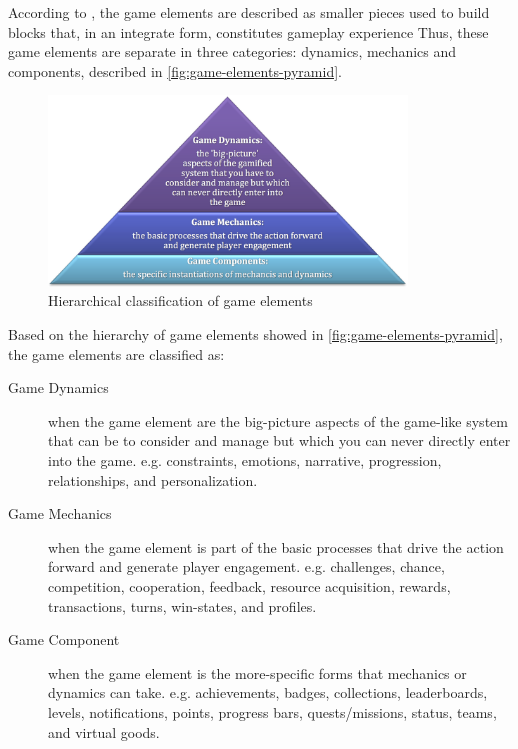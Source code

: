 According to , the game elements are described as smaller pieces used to build blocks that, in an integrate form, constitutes gameplay experience
Thus, these game elements are separate in three categories: dynamics, mechanics and components, described in \autoref{fig:game-elements-pyramid}.

\begin{figure}[htb]
 \caption{Hierarchical classification of game elements}
 \label{fig:game-elements-pyramid}
 \centering
 \includegraphics[width=0.85\textwidth]{images/chap-general-background/game-elements-pyramid.png}
\end{figure}

Based on the hierarchy of game elements showed in \autoref{fig:game-elements-pyramid}, the game elements are classified as:
\begin{description}
\item[Game Dynamics] when the game element are the big-picture aspects of the game-like system that can be to consider and manage but which you can never directly enter into the game. e.g. constraints, emotions, narrative, progression, relationships, and personalization.
\item[Game Mechanics] when the game element is part of the basic processes that drive the action forward and generate player engagement. e.g. challenges, chance, competition, cooperation, feedback, resource acquisition, rewards, transactions, turns, win-states, and profiles.
\item[Game Component] when the game element is the more-specific forms that mechanics or dynamics can take. e.g. achievements, badges, collections, leaderboards, levels, notifications, points, progress bars, quests/missions, status, teams, and virtual goods.
\end{description}

